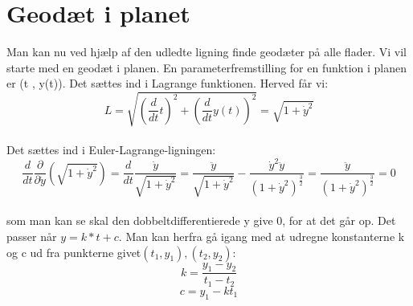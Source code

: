 \section{Geodæt i planet}
Man kan nu ved hjælp af den udledte ligning finde geodæter på alle flader. Vi vil starte med en geodæt i planen. En parameterfremstilling for en funktion i planen er (t , y(t)). Det sættes ind i Lagrange funktionen. Herved får vi: \\
$$L=\sqrt{(\frac{d}{dt}t)^2+(\frac{d}{dt}y(t))^2}=\sqrt{1+\dot{y}^2}$$ \\
Det sættes ind i Euler-Lagrange-ligningen: \\
$$\frac{d}{dt} \frac{\partial}{\partial \dot{y}}(\sqrt{1+\dot{y}^2})=\frac{d}{dt} \frac{\dot{y}}{\sqrt{1+\dot{y}^2}} = \frac{\ddot{y}}{\sqrt{1+\dot{y}^2}}-\frac{\dot{y}^2\ddot{y}}{(1+\dot{y}^2)^\frac{3}{2}}=\frac{\ddot{y}}{(1+\dot{y}^2)^\frac{3}{2}}=0$$ \\
som man kan se skal den dobbeltdifferentierede y give 0, for at det går op. Det passer når $y=k*t+c$. Man kan herfra gå igang med at udregne konstanterne k og c ud fra punkterne givet$(t_{1},y_{1}),(t_{2},y_{2})$: \\
$$k=\frac{y_{1}-y_{2}}{t_{1}-t_{2}}$$
$$c=y_{1}-kt_{1}$$